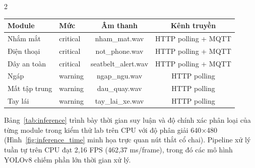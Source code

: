 \documentclass[10pt]{article}
\begin{document}
\begin{multicols}{2}
\vspace{4pt}
\noindent
\begin{minipage}{\columnwidth}
\centering
{}
\label{tab:priority}
\fontsize{7}{8.5}\selectfont
\setlength{\tabcolsep}{2.5pt}
\begin{tabular}{llcc}
\toprule
Module & Mức & Âm thanh & Kênh truyền \\
\midrule
Nhắm mắt & critical & nham\_mat.wav & HTTP polling + MQTT \\
Điện thoại & critical & not\_phone.wav & HTTP polling + MQTT \\
Dây an toàn & critical & seatbelt\_alert.wav & HTTP polling + MQTT \\
Ngáp & warning & ngap\_ngu.wav & HTTP polling \\
Mất tập trung & warning & dau\_quay.wav & HTTP polling \\
Tay lái & warning & tay\_lai\_xe.wav & HTTP polling \\
\bottomrule
\end{tabular}
\end{minipage}

\vspace{4pt}
\noindent
Bảng~\ref{tab:inference} trình bày thời gian suy luận và độ chính xác phân loại của từng module trong kiểm thử lab trên CPU với độ phân giải 640$\times$480 (Hình~\ref{fig:inference_time} minh họa trực quan nút thắt cổ chai). Pipeline xử lý tuần tự trên CPU đạt 2,16 FPS (462,37 ms/frame), trong đó các mô hình YOLOv8 chiếm phần lớn thời gian xử lý.

\vspace{4pt}
\noindent
\begin{minipage}{\columnwidth}
\centering
{}
\label{tab:inference}
\fontsize{7}{8.5}\selectfont
\setlength{\tabcolsep}{2.5pt}
\end{minipage}
\vspace{4pt}


\end{multicols}
\end{document}
